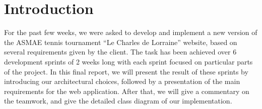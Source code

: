 \section{Introduction}
\label{sec:Introduction}

For the past few weeks, we were asked to develop and implement a new version of
the ASMAE tennis tournament \enquote{Le Charles de Lorraine} website, based on
several requirements given by the client. The task has been achieved over 6
development sprints of 2 weeks long with each sprint focused on particular
parts of the project. In this final report, we will present the result of these
sprints by introducing our architectural choices, followed by a presentation of
the main requirements for the web application. After that, we will give a
commentary on the teamwork, and give the detailed class diagram of our
implementation.
